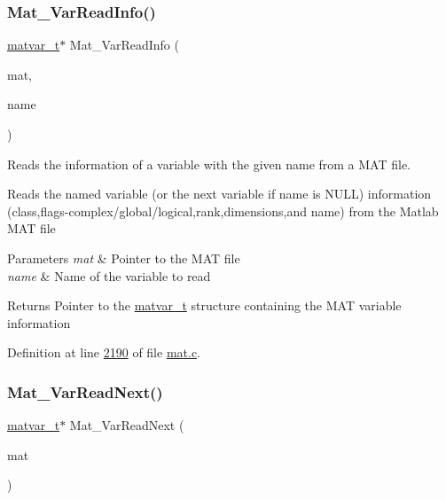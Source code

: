 \subsubsection{\texorpdfstring{Mat\+\_\+\+Var\+Read\+Info()}{Mat\_VarReadInfo()}}
{\footnotesize\ttfamily \hyperlink{group___m_a_t_structmatvar__t}{matvar\+\_\+t}$\ast$ Mat\+\_\+\+Var\+Read\+Info (\begin{DoxyParamCaption}\item[{\hyperlink{group___m_a_t_gab0fc888f5a5d79943b16284b1f91c2e8}{mat\+\_\+t} $\ast$}]{mat,  }\item[{const char $\ast$}]{name }\end{DoxyParamCaption})}



Reads the information of a variable with the given name from a M\+AT file. 

Reads the named variable (or the next variable if name is N\+U\+LL) information (class,flags-\/complex/global/logical,rank,dimensions,and name) from the Matlab M\+AT file


\begin{DoxyParams}{Parameters}
{\em mat} & Pointer to the M\+AT file \\
\hline
{\em name} & Name of the variable to read \\
\hline
\end{DoxyParams}
\begin{DoxyReturn}{Returns}
Pointer to the \hyperlink{group___m_a_t_structmatvar__t}{matvar\+\_\+t} structure containing the M\+AT variable information 
\end{DoxyReturn}


Definition at line \hyperlink{mat_8c_source_l02190}{2190} of file \hyperlink{mat_8c_source}{mat.\+c}.

\mbox{\label{group___m_a_t_ga7c321d6aafd93916ba6c5655ad78e9ca}} 
\subsubsection{\texorpdfstring{Mat\+\_\+\+Var\+Read\+Next()}{Mat\_VarReadNext()}}
{\footnotesize\ttfamily \hyperlink{group___m_a_t_structmatvar__t}{matvar\+\_\+t}$\ast$ Mat\+\_\+\+Var\+Read\+Next (\begin{DoxyParamCaption}\item[{\hyperlink{group___m_a_t_gab0fc888f5a5d79943b16284b1f91c2e8}{mat\+\_\+t} $\ast$}]{mat }\end{DoxyParamCaption})}



